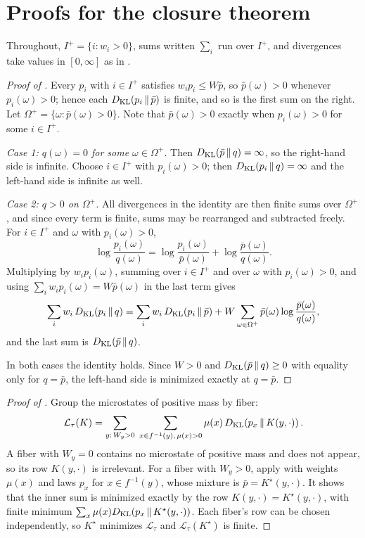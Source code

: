 \section{Proofs for the closure theorem}\label{app:varclosure}

Throughout, $I^+=\{i:w_i>0\}$, sums written $\sum_i$ run over $I^+$, and divergences take values in $[0,\infty]$ as in .

\begin{proof}[Proof of ]
Every $p_i$ with $i\in I^+$ satisfies $w_ip_i\le W\bar p$, so $\bar p(\omega)>0$ whenever $p_i(\omega)>0$; hence each $D_{\mathrm{KL}}\!\left(p_i\,\middle\|\,\bar p\right)$ is finite, and so is the first sum on the right.
Let $\Omega^+=\{\omega:\bar p(\omega)>0\}$.
Note that $\bar p(\omega)>0$ exactly when $p_i(\omega)>0$ for some $i\in I^+$.

\emph{Case 1: $q(\omega)=0$ for some $\omega\in\Omega^+$.}
Then $D_{\mathrm{KL}}\!\left(\bar p\,\middle\|\,q\right)=\infty$, so the right-hand side is infinite.
Choose $i\in I^+$ with $p_i(\omega)>0$; then $D_{\mathrm{KL}}\!\left(p_i\,\middle\|\,q\right)=\infty$ and the left-hand side is infinite as well.

\emph{Case 2: $q>0$ on $\Omega^+$.}
All divergences in the identity are then finite sums over $\Omega^+$, and since every term is finite, sums may be rearranged and subtracted freely.
For $i\in I^+$ and $\omega$ with $p_i(\omega)>0$,
\[
  \log\frac{p_i(\omega)}{q(\omega)}=\log\frac{p_i(\omega)}{\bar p(\omega)}+\log\frac{\bar p(\omega)}{q(\omega)}.
\]
Multiplying by $w_ip_i(\omega)$, summing over $i\in I^+$ and over $\omega$ with $p_i(\omega)>0$, and using $\sum_iw_ip_i(\omega)=W\bar p(\omega)$ in the last term gives
\[
  \sum_i w_i\,D_{\mathrm{KL}}\!\left(p_i\,\middle\|\,q\right)=\sum_i w_i\,D_{\mathrm{KL}}\!\left(p_i\,\middle\|\,\bar p\right)+W\sum_{\omega\in\Omega^+}\bar p(\omega)\log\frac{\bar p(\omega)}{q(\omega)},
\]
and the last sum is $D_{\mathrm{KL}}\!\left(\bar p\,\middle\|\,q\right)$.

In both cases the identity holds.
Since $W>0$ and $D_{\mathrm{KL}}\!\left(\bar p\,\middle\|\,q\right)\ge 0$ with equality only for $q=\bar p$, the left-hand side is minimized exactly at $q=\bar p$.
\end{proof}

\begin{proof}[Proof of ]
Group the microstates of positive mass by fiber:
\[
  \mathcal{L}_\tau(K)=\sum_{y:\,W_y>0}\;\sum_{x\in f^{-1}(y),\,\mu(x)>0}\mu(x)\,D_{\mathrm{KL}}\!\left(p_x\,\middle\|\,K(y,\cdot)\right).
\]
A fiber with $W_y=0$ contains no microstate of positive mass and does not appear, so its row $K(y,\cdot)$ is irrelevant.
For a fiber with $W_y>0$, apply  with weights $\mu(x)$ and laws $p_x$ for $x\in f^{-1}(y)$, whose mixture is $\bar p=K^\star(y,\cdot)$.
It shows that the inner sum is minimized exactly by the row $K(y,\cdot)=K^\star(y,\cdot)$, with finite minimum $\sum_x\mu(x)D_{\mathrm{KL}}\!\left(p_x\,\middle\|\,K^\star(y,\cdot)\right)$.
Each fiber's row can be chosen independently, so $K^\star$ minimizes $\mathcal{L}_\tau$ and $\mathcal{L}_\tau(K^\star)$ is finite.
\end{proof}

